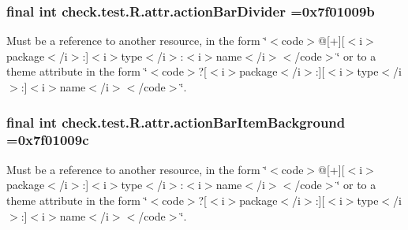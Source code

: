 \subsubsection[{action\+Bar\+Divider}]{\setlength{\rightskip}{0pt plus 5cm}final int check.\+test.\+R.\+attr.\+action\+Bar\+Divider =0x7f01009b\hspace{0.3cm}{\ttfamily [static]}}\label{classcheck_1_1test_1_1_r_1_1attr_a231d531e25674903c0fc051027b53e1f}
Must be a reference to another resource, in the form \char`\"{}$<$code$>$@\mbox{[}+\mbox{]}\mbox{[}$<$i$>$package$<$/i$>$\+:\mbox{]}$<$i$>$type$<$/i$>$\+:$<$i$>$name$<$/i$>$$<$/code$>$\char`\"{} or to a theme attribute in the form \char`\"{}$<$code$>$?\mbox{[}$<$i$>$package$<$/i$>$\+:\mbox{]}\mbox{[}$<$i$>$type$<$/i$>$\+:\mbox{]}$<$i$>$name$<$/i$>$$<$/code$>$\char`\"{}. \hypertarget{classcheck_1_1test_1_1_r_1_1attr_a11f2699ca7c3187bf87d25f5d33e1237}{}
\subsubsection[{action\+Bar\+Item\+Background}]{\setlength{\rightskip}{0pt plus 5cm}final int check.\+test.\+R.\+attr.\+action\+Bar\+Item\+Background =0x7f01009c\hspace{0.3cm}{\ttfamily [static]}}\label{classcheck_1_1test_1_1_r_1_1attr_a11f2699ca7c3187bf87d25f5d33e1237}
Must be a reference to another resource, in the form \char`\"{}$<$code$>$@\mbox{[}+\mbox{]}\mbox{[}$<$i$>$package$<$/i$>$\+:\mbox{]}$<$i$>$type$<$/i$>$\+:$<$i$>$name$<$/i$>$$<$/code$>$\char`\"{} or to a theme attribute in the form \char`\"{}$<$code$>$?\mbox{[}$<$i$>$package$<$/i$>$\+:\mbox{]}\mbox{[}$<$i$>$type$<$/i$>$\+:\mbox{]}$<$i$>$name$<$/i$>$$<$/code$>$\char`\"{}. \hypertarget{classcheck_1_1test_1_1_r_1_1attr_a4ab4b2cb9a1376a8d56e464bd8eb74a2}{}
